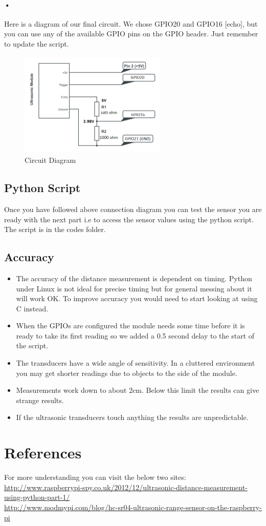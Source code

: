 \documentclass[11pt,a4paper]{article}
\begin{document}
\paragraph{•}
Here is a diagram of our final circuit. We chose GPIO20 and GPIO16 [echo], but you can use any of the available GPIO pins on the GPIO header. Just remember to update the script.
	\begin{figure}[H]
	 	\centering
		\includegraphics[width=7cm,height=5cm]{pin}
		\caption{Circuit Diagram}
	\end{figure}
	\subsection{Python Script}
		Once you have followed above connection diagram you can test the sensor you are ready with the next part i.e to access the sensor values using the python script. The script is in the codes folder.
	\subsection{Accuracy}
		\begin{itemize}
			\item The accuracy of the distance measurement is dependent on timing. Python under Linux is not ideal for precise timing but for general messing about it will work OK. To improve accuracy you would need to start looking at using C instead.
			\item When the GPIOs are configured the module needs some time before it is ready to take its first reading so we added a 0.5 second delay to the start of the script.
			\item The transducers have a wide angle of sensitivity. In a cluttered environment you may get shorter readings due to objects to the side of the module.
			\item Measurements work down to about 2cm. Below this limit the results can give strange results.
			\item If the ultrasonic transducers touch anything the results are unpredictable.
		\end{itemize}
	\section{References}
		For more understanding you can visit the below two sites:\\
			\url{http://www.raspberrypi-spy.co.uk/2012/12/ultrasonic-distance-measurement-using-python-part-1/}\\
			\url{http://www.modmypi.com/blog/hc-sr04-ultrasonic-range-sensor-on-the-raspberry-pi}
	
\end{document}
